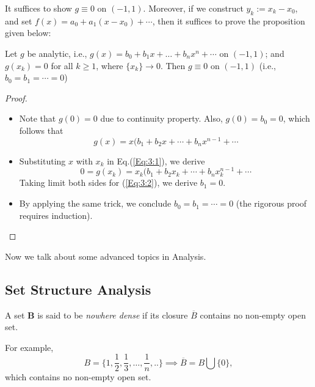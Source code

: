 It suffices to show $g\equiv0$ on $(-1,1)$. Moreover, if we construct $y_k:=x_k - x_0$, and set $f(x) = a_0+a_1(x-x_0)+\cdots$, then it suffices to prove the proposition given below:
\begin{proposition}\label{Pro:3:1}
Let $g$ be analytic, i.e., $g(x)= b_0+b_1x+\dots+b_nx^n+\cdots$ on $(-1,1)$; and $g(x_k)=0$ for all $k\ge1$, where $\{x_k\}\to0$. Then $g\equiv0$ on $(-1,1)$ (i.e., $b_0=b_1=\cdots=0$)
\end{proposition}
\begin{proof}
\begin{itemize}
\item
Note that $g(0)=0$ due to continuity property. Also, $g(0) = b_0=0$, which follows that
\begin{equation}
g(x) = x(b_1+b_2x+\cdots+b_nx^{n-1}+\cdots\label{Eq:3:1}
\end{equation}
\item
Substituting $x$ with $x_k$ in Eq.(\ref{Eq:3:1}), we derive
\begin{equation}
0=g(x_k) = x_k(b_1+b_2x_k+\cdots+b_nx^{n-1}_k+\cdots\label{Eq:3:2}
\end{equation}
Taking limit both sides for (\ref{Eq:3:2}), we derive $b_1=0$.
\item
By applying the same trick, we conclude $b_0=b_1=\cdots=0$ (the rigorous proof requires induction).
\end{itemize}
\end{proof}

Now we talk about some advanced topics in Analysis.

\subsection{Set Structure Analysis}
\begin{definition}
A set $\bm B$ is said to be \emph{nowhere dense} if its closure $\overline{B}$ contains no non-empty open set.
\end{definition}
For example,
\[
B = \{1,\frac{1}{2},\frac{1}{3},\dots,\frac{1}{n},..\}\implies
\overline{B} = B\bigcup\{0\},
\]
which contains no non-empty open set.

